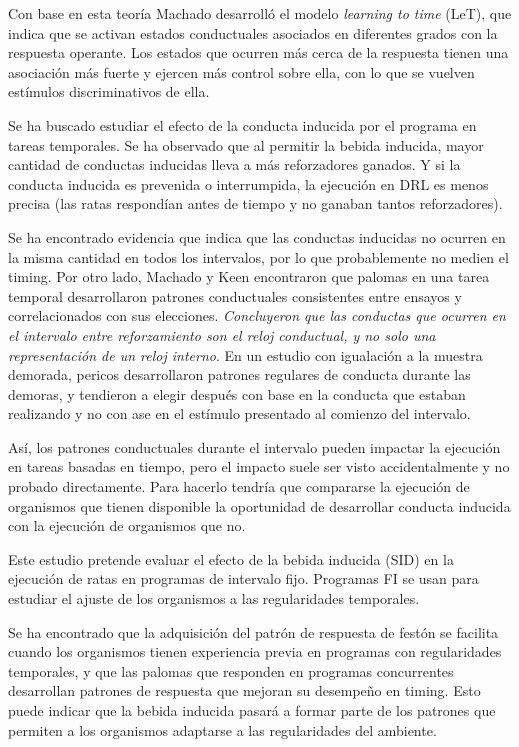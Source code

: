 \documentclass[a4paper,12pt]{article}
\begin{document}
Con base en esta teoría Machado desarrolló el modelo {\itshape learning to time} (LeT), que indica que se activan estados conductuales asociados en diferentes grados con la respuesta operante. Los estados que ocurren más cerca de la respuesta tienen una asociación más fuerte y ejercen más control sobre ella, con lo que se vuelven estímulos discriminativos de ella.

Se ha buscado estudiar el efecto de la conducta inducida por el programa en tareas temporales. Se ha observado que al permitir la bebida inducida, mayor cantidad de conductas inducidas lleva a más reforzadores ganados. Y si la conducta inducida es prevenida o interrumpida, la ejecución en DRL es menos precisa (las ratas respondían antes de tiempo y no ganaban tantos reforzadores).

Se ha encontrado evidencia que indica que las conductas inducidas no ocurren en la misma cantidad en todos los intervalos, por lo que probablemente no medien el timing. Por otro lado, Machado y Keen encontraron que palomas en una tarea temporal desarrollaron patrones conductuales consistentes entre ensayos y correlacionados con sus elecciones. {\itshape Concluyeron que las conductas que ocurren en el intervalo entre reforzamiento son el reloj conductual, y no solo una representación de un reloj interno}. En un estudio con igualación a la muestra demorada, pericos desarrollaron patrones regulares de conducta durante las demoras, y tendieron a elegir después con base en la conducta que estaban realizando y no con ase en el estímulo presentado al comienzo del intervalo.

Así, los patrones conductuales durante el intervalo pueden impactar la ejecución en tareas basadas en tiempo, pero el impacto suele ser visto accidentalmente y no probado directamente. Para hacerlo tendría que compararse la ejecución de organismos que tienen disponible la oportunidad de desarrollar conducta inducida con la ejecución de organismos que no.

Este estudio pretende evaluar el efecto de la bebida inducida (SID) en la ejecución de ratas en programas de intervalo fijo. Programas FI se usan para estudiar el ajuste de los organismos a las regularidades temporales.

Se ha encontrado que la adquisición del patrón de respuesta de festón se facilita cuando los organismos tienen experiencia previa en programas con regularidades temporales, y que las palomas que responden en programas concurrentes desarrollan patrones de respuesta que mejoran su desempeño en timing. Esto puede indicar que la bebida inducida pasará a formar parte de los patrones que permiten a los organismos adaptarse a las regularidades del ambiente.
\end{document}

